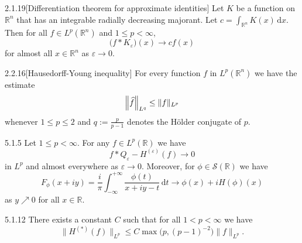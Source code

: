 \documentclass[../dissertation.tex]{subfiles}
\begin{document}
\begin{mcor}{2.1.19}[Differentiation theorem for approximate identities]
	Let $K$ be a function on $\mathbb R^n$ that has an integrable radially 
	decreasing majorant. Let $c = \int_{\mathbb R^n} K(x) \, \mathrm{d}x$. Then for all 
	$f \in L^p(\mathbb R^n)$ and $1 \leq p < \infty$, 
	\[
		\big( f * K_\varepsilon \big)(x) \to c f(x)
	\]
	for almost all $x \in \mathbb R^n$ as $\varepsilon \to 0$.
\end{mcor}


\begin{mprop}{2.2.16}[Hausedorff-Young inequality]
	For every function $f$ in $L^p(\mathbb R^n)$ we have the estimate
	\[
		\left\|\widehat{f} \right\|_{L^{q}} \leq \|f\|_{L^p}
	\]
	whenever $1\leq p\leq 2$ and $q:= \frac{p}{p-1}$ denotes the 
	H\"older conjugate of $p$.
\end{mprop}


\begin{mthm}{5.1.5}
	Let $1\leq p < \infty$. For any $f \in L^p(\mathbb R)$ we have
	\[
		f*Q_\varepsilon - H^{(\varepsilon)}(f) \to 0
	\]
	in $L^p$ and almost everywhere as $\varepsilon \to 0$. Moreover, for 
	$\phi \in \mathscr S(\mathbb R)$ we have
	\[
		F_\phi(x + iy)
			= \frac{i}{\pi} \int_{-\infty}^{+\infty} 
					\frac{\phi(t)}{x+iy - t}
				\, \mathrm{d}t
			\to \phi(x) + i H(\phi)(x)
	\]
	as $y\nearrow0$ for all $x \in \mathbb R$.
\end{mthm}


\begin{mthm}{5.1.12}
	There exists a constant $C$ such that for all $1< p< \infty$ we have 
	\[
		\|H^{(*)}(f)\|_{L^p} 
			\leq C \max \big(p, (p-1)^{-2}\big) \|f\|_{L^p}.
	\]
\end{mthm}
\end{document}

